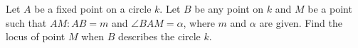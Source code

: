 Let $A$ be a fixed point on a circle $k$. Let $B$ be any point on $k$ and $M$ be a point such that $AM:AB=m$ and $\angle BAM=\alpha$, where $m$ and $\alpha$ are given. Find the locus of point $M$ when $B$ describes the circle $k$.